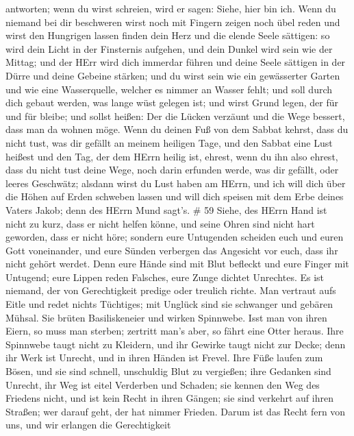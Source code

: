 antworten; wenn du wirst schreien, wird er sagen: Siehe, hier bin ich.
Wenn du niemand bei dir beschweren wirst noch mit Fingern zeigen noch
übel reden  und wirst den Hungrigen lassen finden dein Herz
und die elende Seele sättigen: so wird dein Licht in der Finsternis
aufgehen, und dein Dunkel wird sein wie der Mittag;  und
der HErr wird dich immerdar führen und deine Seele sättigen in der Dürre
und deine Gebeine stärken; und du wirst sein wie ein gewässerter Garten
und wie eine Wasserquelle, welcher es nimmer an Wasser fehlt;
 und soll durch dich gebaut werden, was lange wüst gelegen
ist; und wirst Grund legen, der für und für bleibe; und sollst heißen:
Der die Lücken verzäunt und die Wege bessert, dass man da wohnen möge.
 Wenn du deinen Fuß von dem Sabbat kehrst, dass du nicht
tust, was dir gefällt an meinem heiligen Tage, und den Sabbat eine Lust
heißest und den Tag, der dem HErrn heilig ist, ehrest, wenn du ihn also
ehrest, dass du nicht tust deine Wege, noch darin erfunden werde, was
dir gefällt, oder leeres Geschwätz;  alsdann wirst du Lust
haben am HErrn, und ich will dich über die Höhen auf Erden schweben
lassen und will dich speisen mit dem Erbe deines Vaters Jakob; denn des
HErrn Mund sagt's. \# 59  Siehe, des HErrn Hand ist nicht zu
kurz, dass er nicht helfen könne, und seine Ohren sind nicht hart
geworden, dass er nicht höre;  sondern eure Untugenden
scheiden euch und euren Gott voneinander, und eure Sünden verbergen das
Angesicht vor euch, dass ihr nicht gehört werdet.  Denn eure
Hände sind mit Blut befleckt und eure Finger mit Untugend; eure Lippen
reden Falsches, eure Zunge dichtet Unrechtes.  Es ist
niemand, der von Gerechtigkeit predige oder treulich richte. Man
vertraut aufs Eitle und redet nichts Tüchtiges; mit Unglück sind sie
schwanger und gebären Mühsal.  Sie brüten Basiliskeneier und
wirken Spinnwebe. Isst man von ihren Eiern, so muss man sterben;
zertritt man's aber, so fährt eine Otter heraus.  Ihre
Spinnwebe taugt nicht zu Kleidern, und ihr Gewirke taugt nicht zur
Decke; denn ihr Werk ist Unrecht, und in ihren Händen ist Frevel.
 Ihre Füße laufen zum Bösen, und sie sind schnell,
unschuldig Blut zu vergießen; ihre Gedanken sind Unrecht, ihr Weg ist
eitel Verderben und Schaden;  sie kennen den Weg des
Friedens nicht, und ist kein Recht in ihren Gängen; sie sind verkehrt
auf ihren Straßen; wer darauf geht, der hat nimmer Frieden. 
Darum ist das Recht fern von uns, und wir erlangen die Gerechtigkeit
